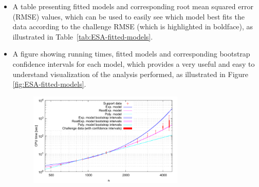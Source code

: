\documentclass[aic]{iosart2x}
\begin{document}
\begin{itemize}
\item A table presenting fitted models and corresponding root mean squared error (RMSE) values, which can be used to easily see which model best fits the data according to the challenge RMSE (which is highlighted in boldface), as illustrated
in Table~\ref{tab:ESA-fitted-models}.
\begin{table}[t]
\caption{Scaling models fitted to EAX RUE Instance data \label{tab:ESA-fitted-models}}
\begin{centering}
%
\medskip{}
\par
\end{centering}
\end{table}

\item A figure showing running times, fitted models and corresponding bootstrap confidence intervals for each model, which provides a very useful and easy to understand visualization of the analysis performed, as illustrated in Figure \ref{fig:ESA-fitted-models}.
\begin{figure}[t]
\noindent \begin{centering}
\includegraphics[width=0.7\textwidth]{EAX_fittedModels} \vspace{-5mm}

\par\end{centering}


\end{figure}
\end{itemize}
\end{document}
